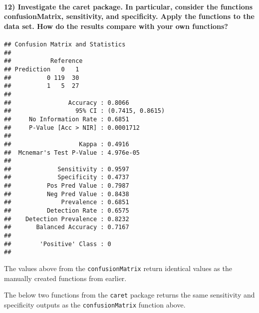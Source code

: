 \documentclass[]{article}
\newenvironment{Shaded}{\begin{snugshade}}{\end{snugshade}}
\newcommand{\KeywordTok}[1]{\textcolor[rgb]{0.13,0.29,0.53}{\textbf{#1}}}
\newcommand{\OperatorTok}[1]{\textcolor[rgb]{0.81,0.36,0.00}{\textbf{#1}}}
\newcommand{\NormalTok}[1]{#1}
\let\oldparagraph\paragraph
\renewcommand{\paragraph}[1]{\oldparagraph{#1}\mbox{}}
\begin{document}
\paragraph{12) Investigate the caret package. In particular, consider
the functions confusionMatrix, sensitivity, and specificity. Apply the
functions to the data set. How do the results compare with your own
functions?}\label{investigate-the-caret-package.-in-particular-consider-the-functions-confusionmatrix-sensitivity-and-specificity.-apply-the-functions-to-the-data-set.-how-do-the-results-compare-with-your-own-functions}

\begin{Shaded}
\end{Shaded}

\begin{verbatim}
## Confusion Matrix and Statistics
## 
##           Reference
## Prediction   0   1
##          0 119  30
##          1   5  27
##                                           
##                Accuracy : 0.8066          
##                  95% CI : (0.7415, 0.8615)
##     No Information Rate : 0.6851          
##     P-Value [Acc > NIR] : 0.0001712       
##                                           
##                   Kappa : 0.4916          
##  Mcnemar's Test P-Value : 4.976e-05       
##                                           
##             Sensitivity : 0.9597          
##             Specificity : 0.4737          
##          Pos Pred Value : 0.7987          
##          Neg Pred Value : 0.8438          
##              Prevalence : 0.6851          
##          Detection Rate : 0.6575          
##    Detection Prevalence : 0.8232          
##       Balanced Accuracy : 0.7167          
##                                           
##        'Positive' Class : 0               
## 
\end{verbatim}

The values above from the \texttt{confusionMatrix} return identical
values as the manually created functions from earlier.

The below two functions from the \texttt{caret} package returns the same
sensitivity and specificity outputs as the \texttt{confusionMatrix}
function above.
\end{document}
